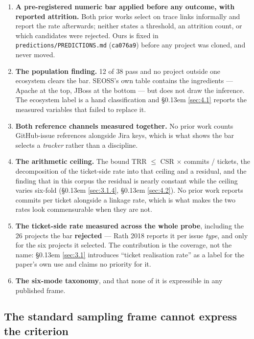 \documentclass[conference]{IEEEtran}
\begin{document}
\begin{enumerate}
\item \textbf{A pre-registered numeric bar applied before any outcome, with reported attrition.} Both prior works select on trace links informally and report the rate afterwards; neither states a threshold, an attrition count, or which candidates were rejected. Ours is fixed in \texttt{predictions/\allowbreak{}PREDICTIONS.\allowbreak{}md} (\texttt{ca076a9}) before any project was cloned, and never moved.
\item \textbf{The population finding.} 12 of 38 pass and no project outside one ecosystem clears the bar. SEOSS's own table contains the ingredients --- Apache at the top, JBoss at the bottom --- but does not draw the inference. The ecosystem label is a hand classification and \S\kern0.13em \ref{sec:4.1} reports the measured variables that failed to replace it.
\item \textbf{Both reference channels measured together.} No prior work counts GitHub-issue references alongside Jira keys, which is what shows the bar selects a \emph{tracker} rather than a discipline.
\item \textbf{The arithmetic ceiling.} The bound TRR $\leq$ CSR $\times$ commits / tickets, the decomposition of the ticket-side rate into that ceiling and a residual, and the finding that in this corpus the residual is nearly constant while the ceiling varies six-fold (\S\kern0.13em \ref{sec:3.1.4}, \S\kern0.13em \ref{sec:4.2}). No prior work reports commits per ticket alongside a linkage rate, which is what makes the two rates look commensurable when they are not.
\item \textbf{The ticket-side rate measured across the whole probe}, including the 26 projects the bar \textbf{rejected} --- Rath 2018 reports it per issue \emph{type}, and only for the six projects it selected. The contribution is the coverage, not the name: \S\kern0.13em \ref{sec:3.1} introduces ``ticket realisation rate'' as a label for the paper's own use and claims no priority for it.
\item \textbf{The six-mode taxonomy}, and that none of it is expressible in any published frame.
\end{enumerate}

\subsection{The standard sampling frame cannot express the criterion}
\label{sec:2.3}
\end{document}

